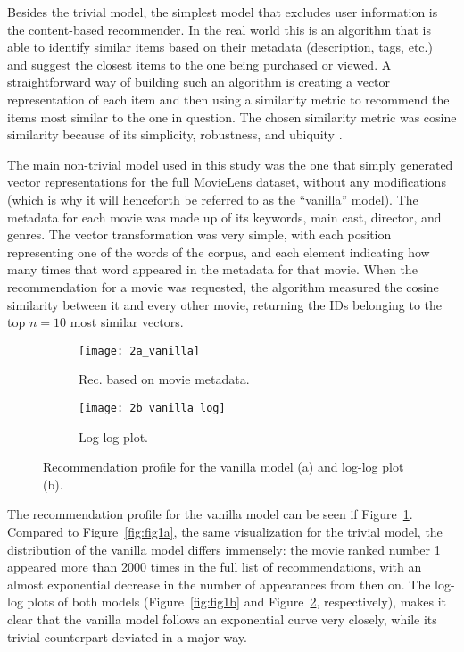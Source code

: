 Besides the trivial model, the simplest model that excludes user information is
the content-based recommender. In the real world this is an algorithm that is
able to identify similar items based on their metadata (description, tags, etc.)
and suggest the closest items to the one being purchased or viewed. A
straightforward way of building such an algorithm is creating a vector
representation of each item and then using a similarity metric to recommend the
items most similar to the one in question. The chosen similarity metric was
cosine similarity because of its simplicity, robustness, and ubiquity
\citep{sarwar_item-based_2001}.

The main non-trivial model used in this study was the one that simply generated
vector representations for the full MovieLens dataset, without any modifications
(which is why it will henceforth be referred to as the ``vanilla'' model). The
metadata for each movie was made up of its keywords, main cast, director, and
genres. The vector transformation was very simple, with each position
representing one of the words of the corpus, and each element indicating how
many times that word appeared in the metadata for that movie. When the
recommendation for a movie was requested, the algorithm measured the cosine
similarity between it and every other movie, returning the IDs belonging to
the top $n = 10$ most similar vectors.

\begin{figure}
  \centering
  \begin{subfigure}{0.45\textwidth}
    \centering
    \texttt{[image: 2a\_vanilla]}
    \caption{Rec. based on movie metadata.\label{fig:fig2a}}
  \end{subfigure}
  \begin{subfigure}{0.45\textwidth}
    \centering
    \texttt{[image: 2b\_vanilla\_log]}
    \caption{Log-log plot.\label{fig:fig2b}}
  \end{subfigure}
  \caption{Recommendation profile for the vanilla model (a) and log-log plot
    (b).\label{fig:fig2}}
\end{figure}

The recommendation profile for the vanilla model can be seen if
Figure~\ref{fig:fig2a}. Compared to Figure~\ref{fig:fig1a}, the same
visualization for the trivial model, the distribution of the vanilla model
differs immensely: the movie ranked number 1 appeared more than 2000 times in
the full list of recommendations, with an almost exponential decrease in the
number of appearances from then on. The log-log plots of both models
(Figure~\ref{fig:fig1b} and Figure~\ref{fig:fig2b}, respectively), makes it
clear that the vanilla model follows an exponential curve very closely, while
its trivial counterpart deviated in a major way.

